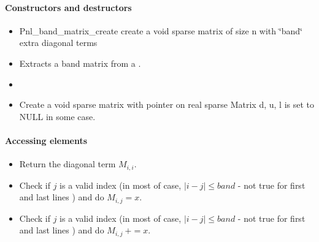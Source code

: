 \paragraph{Constructors and destructors}
\begin{itemize}
\item 
  \sshortdescribe Pnl_band_matrix_create create a void sparse matrix of size n with
  \char`\"{}band\char`\"{} extra diagonal terms
\item
  \sshortdescribe Extracts a band matrix from a .
\item

\item 
  \sshortdescribe Create a void sparse matrix with pointer on real sparse Matrix d, u, l is set
  to NULL in some case.
\end{itemize}
\paragraph{Accessing elements}
\begin{itemize}
\item 
  \sshortdescribe Return the diagonal term $M_{i, i}$.
\item 
  \sshortdescribe Check if $j$ is a valid index (in most of case, $|i-j|\leq
  band $ - not true for first and last lines )
  and do $M_{i, j}=x$.
\item 
  \sshortdescribe Check if $j$ is a valid index (in most of case, $|i-j|\leq
  band $ - not true for first and last lines )
  and do $M_{i, j} \ +=x$.
\end{itemize}

